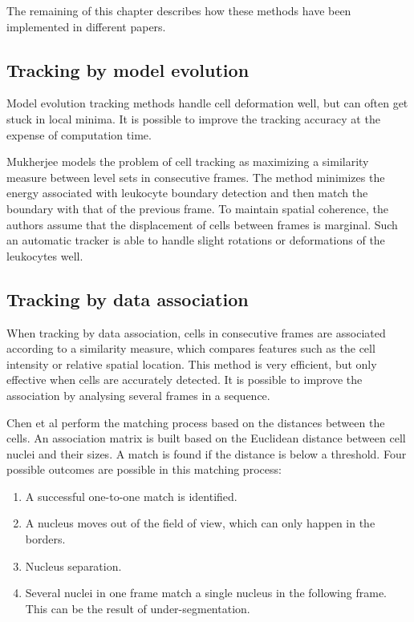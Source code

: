 \documentclass[12pt,a4paper,openany]{book}
\begin{document}
The remaining of this chapter describes how these methods have been implemented in different papers.

\subsection{Tracking by model evolution}

Model evolution tracking methods handle cell deformation well, but can often get stuck in local minima. It is possible to improve the tracking accuracy at the expense of computation time.

Mukherjee \cite{mukherjee04} models the problem of cell tracking as maximizing a similarity measure between level sets in consecutive frames. The method minimizes the energy associated with leukocyte boundary detection and then match the boundary with that of the previous frame. To maintain spatial coherence, the authors assume that the displacement of cells between frames is marginal. Such an automatic tracker is able to handle slight rotations or deformations of the leukocytes well.

\subsection{Tracking by data association}

When tracking by data association, cells in consecutive frames are associated according to a similarity measure, which compares features such as the cell intensity or relative spatial location. This method is very efficient, but only effective when cells are accurately detected. It is possible to improve the association by analysing several frames in a sequence.

Chen et al \cite{chen06} perform the matching process based on the distances between the cells. An association matrix is built based on the Euclidean distance between cell nuclei and their sizes. A match is found if the distance is below a threshold. Four possible outcomes are possible in this matching process:

\begin{enumerate}
	\item A successful one-to-one match is identified.
	\item A nucleus moves out of the field of view, which can only happen in the borders.
	\item Nucleus separation.
	\item Several nuclei in one frame match a single nucleus in the following frame. This can be the result of under-segmentation.
\end{enumerate}
\end{document}
